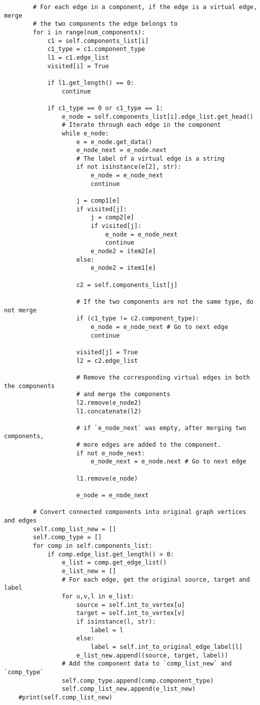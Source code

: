 \begin{verbatim}
		# For each edge in a component, if the edge is a virtual edge, merge
		# the two components the edge belongs to
		for i in range(num_components):
			c1 = self.components_list[i]
			c1_type = c1.component_type
			l1 = c1.edge_list
			visited[i] = True

			if l1.get_length() == 0:
				continue

			if c1_type == 0 or c1_type == 1:
				e_node = self.components_list[i].edge_list.get_head()
				# Iterate through each edge in the component
				while e_node:
					e = e_node.get_data()
					e_node_next = e_node.next
					# The label of a virtual edge is a string
					if not isinstance(e[2], str):
						e_node = e_node_next
						continue

					j = comp1[e]
					if visited[j]:
						j = comp2[e]
						if visited[j]:
							e_node = e_node_next
							continue
						e_node2 = item2[e]
					else:
						e_node2 = item1[e]

					c2 = self.components_list[j]

					# If the two components are not the same type, do not merge
					if (c1_type != c2.component_type):
						e_node = e_node_next # Go to next edge
						continue

					visited[j] = True
					l2 = c2.edge_list

					# Remove the corresponding virtual edges in both the components
					# and merge the components
					l2.remove(e_node2)
					l1.concatenate(l2)

					# if `e_node_next` was empty, after merging two components,
					# more edges are added to the component.
					if not e_node_next:
						e_node_next = e_node.next # Go to next edge

					l1.remove(e_node)

					e_node = e_node_next

		# Convert connected components into original graph vertices and edges
		self.comp_list_new = []
		self.comp_type = []
		for comp in self.components_list:
			if comp.edge_list.get_length() > 0:
				e_list = comp.get_edge_list()
				e_list_new = []
				# For each edge, get the original source, target and label
				for u,v,l in e_list:
					source = self.int_to_vertex[u]
					target = self.int_to_vertex[v]
					if isinstance(l, str):
						label = l
					else:
						label = self.int_to_original_edge_label[l]
					e_list_new.append((source, target, label))
				# Add the component data to `comp_list_new` and `comp_type`
				self.comp_type.append(comp.component_type)
				self.comp_list_new.append(e_list_new)
	#print(self.comp_list_new)


\end{verbatim}
